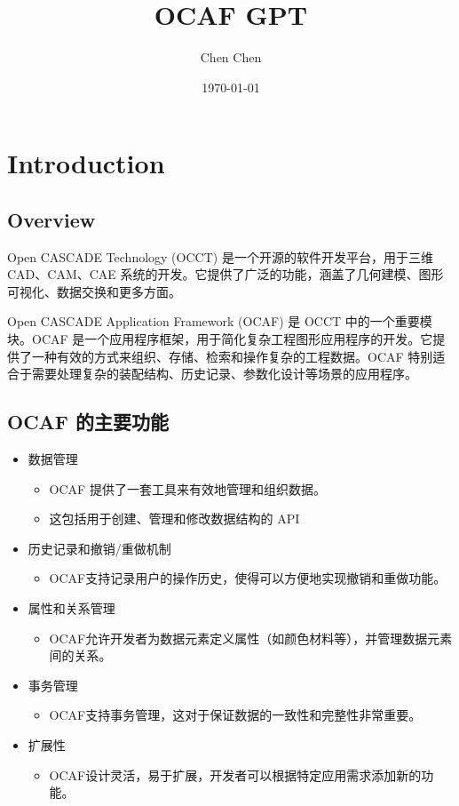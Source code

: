 \documentclass[11pt]{article}
\author{Chen Chen}
\date{\today}
\title{OCAF GPT}
\begin{document}
\maketitle
\tableofcontents

\section{Introduction}
\label{sec:orgeb60ec6}

\subsection{Overview}
\label{sec:orgae51fd3}

Open CASCADE Technology (OCCT) 是一个开源的软件开发平台，用于三维 CAD、CAM、CAE 系统的开发。它提供了广泛的功能，涵盖了几何建模、图形可视化、数据交换和更多方面。

Open CASCADE Application Framework (OCAF) 是 OCCT 中的一个重要模块。OCAF 是一个应用程序框架，用于简化复杂工程图形应用程序的开发。它提供了一种有效的方式来组织、存储、检索和操作复杂的工程数据。OCAF 特别适合于需要处理复杂的装配结构、历史记录、参数化设计等场景的应用程序。
\subsection{OCAF 的主要功能}
\label{sec:org4c40ce4}

\begin{itemize}
\item 数据管理
\begin{itemize}
\item OCAF 提供了一套工具来有效地管理和组织数据。
\item 这包括用于创建、管理和修改数据结构的 API
\end{itemize}
\item 历史记录和撤销/重做机制
\begin{itemize}
\item OCAF支持记录用户的操作历史，使得可以方便地实现撤销和重做功能。
\end{itemize}
\item 属性和关系管理
\begin{itemize}
\item OCAF允许开发者为数据元素定义属性（如颜色材料等），并管理数据元素间的关系。
\end{itemize}
\item 事务管理
\begin{itemize}
\item OCAF支持事务管理，这对于保证数据的一致性和完整性非常重要。
\end{itemize}
\item 扩展性
\begin{itemize}
\item OCAF设计灵活，易于扩展，开发者可以根据特定应用需求添加新的功能。
\end{itemize}
\end{itemize}
\end{document}
